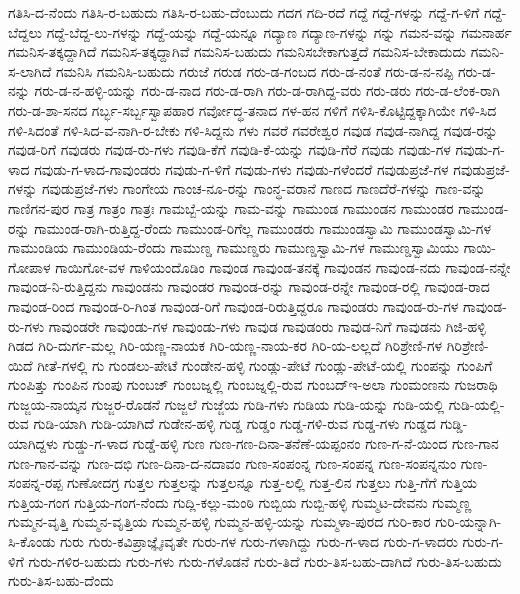 {ಗತಿಸಿ-ದ-ನೆಂದು
ಗತಿಸಿ-ರ-ಬಹುದು
ಗತಿಸಿ-ರ-ಬಹು-ದೆಂಬುದು
ಗದಗ
ಗದಿ-ರದೆ
ಗದ್ದೆ
ಗದ್ದೆ-ಗಳನ್ನು
ಗದ್ದೆ-ಗ-ಳಿಗೆ
ಗದ್ದೆ-ಬೆದ್ದಲು
ಗದ್ದೆ-ಬೆದ್ದ-ಲು-ಗಳನ್ನು
ಗದ್ದೆ-ಯನ್ನು
ಗದ್ದೆ-ಯನ್ನೂ
ಗದ್ಯಾಣ
ಗದ್ಯಾಣ-ಗಳನ್ನು
ಗನ್ನು
ಗಮನ-ವನ್ನು
ಗಮನಾರ್ಹ
ಗಮನಿಸ-ತಕ್ಕದ್ದಾಗಿದೆ
ಗಮನಿಸ-ತಕ್ಕದ್ದಾಗಿವೆ
ಗಮನಿಸ-ಬಹುದು
ಗಮನಿಸಬೇಕಾಗುತ್ತದೆ
ಗಮನಿಸ-ಬೇಕಾದುದು
ಗಮನಿ-ಸ-ಲಾಗಿದೆ
ಗಮನಿಸಿ
ಗಮನಿಸಿ-ಬಹುದು
ಗರುಜೆ
ಗರುಡ
ಗರು-ಡ-ಗಂಬದ
ಗರು-ಡ-ನಂತೆ
ಗರು-ಡ-ನ-ನಪ್ಪಿ
ಗರು-ಡ-ನನ್ನು
ಗರು-ಡ-ನ-ಹಳ್ಳಿ-ಯನ್ನು
ಗರು-ಡ-ನಾದ
ಗರು-ಡ-ರಾಗಿ
ಗರು-ಡ-ರಾಗಿದ್ದ-ವರು
ಗರು-ಡರು
ಗರು-ಡ-ಲೆಂಕ-ರಾಗಿ
ಗರು-ಡ-ಶಾ-ಸನದ
ಗರ್ಬ್ಭ-ಸರ್ಬ್ಬಸ್ವಾಪಹಾರ
ಗರ್ವೋದ್ಧ-ತನಾದ
ಗಳ-ಹನ
ಗಳಿಗೆ
ಗಳಿಸಿ-ಕೊಟ್ಟಿದ್ದಕ್ಕಾಗಿಯೇ
ಗಳಿ-ಸಿದ
ಗಳಿ-ಸಿದಂತೆ
ಗಳಿ-ಸಿದ-ವ-ನಾಗಿ-ರ-ಬೇಕು
ಗಳಿ-ಸಿದ್ದನು
ಗಳು
ಗವರೆ
ಗವರೇಶ್ವರ
ಗವುಡ
ಗವುಡ-ನಾಗಿದ್ದ
ಗವುಡ-ರನ್ನು
ಗವುಡ-ರಿಗೆ
ಗವುಡರು
ಗವುಡ-ರು-ಗಳು
ಗವುಡಿ-ಕೆಗೆ
ಗವುಡಿ-ಕೆ-ಯನ್ನು
ಗವುಡಿ-ಗೆರೆ
ಗವುಡು
ಗವುಡು-ಗಳ
ಗವುಡು-ಗ-ಳಾದ
ಗವುಡು-ಗ-ಳಾದ-ಗಾವುಂಡರು
ಗವುಡು-ಗ-ಳಿಗೆ
ಗವುಡು-ಗಳು
ಗವುಡು-ಗಳೆಂದರೆ
ಗವುಡುಪ್ರಜೆ-ಗಳ
ಗವುಡುಪ್ರಜೆ-ಗಳನ್ನು
ಗವುಡುಪ್ರಜೆ-ಗಳು
ಗಾಂಗೇಯ
ಗಾಂಚ-ನೂ-ರನ್ನು
ಗಾಂನ್ಧ-ವರಾನೆ
ಗಾಣದ
ಗಾಣದೆರೆ-ಗಳನ್ನು
ಗಾಣ-ವನ್ನು
ಗಾಣಿಗನ-ಪುರ
ಗಾತ್ರ
ಗಾತ್ರಂ
ಗಾತ್ರಃ
ಗಾಮಬ್ಬೆ-ಯನ್ನು
ಗಾಮ-ವನ್ನು
ಗಾಮುಂಡ
ಗಾಮುಂಡನ
ಗಾಮುಂಡರ
ಗಾಮುಂಡ-ರನ್ನು
ಗಾಮುಂಡ-ರಾಗಿ-ರುತ್ತಿದ್ದ-ರೆಂದು
ಗಾಮುಂಡ-ರಿಗೆಲ್ಲ
ಗಾಮುಂಡರು
ಗಾಮುಂಡಸ್ವಾಮಿ
ಗಾಮುಂಡಸ್ವಾಮಿ-ಗಳ
ಗಾಮುಂಡಿಯ
ಗಾಮುಂಡಿಯ-ರೆಂದು
ಗಾಮುಣ್ಡ
ಗಾಮುಣ್ಡರು
ಗಾಮುಣ್ಡಸ್ವಾಮಿ-ಗಳ
ಗಾಮುಣ್ಡಸ್ವಾಮಿಯು
ಗಾಯಿ-ಗೋಪಾಳ
ಗಾಯಿಗೋ-ವಳ
ಗಾಳಿಯಂದೊಡಿಂ
ಗಾವುಂಡ
ಗಾವುಂಡ-ತನಕ್ಕೆ
ಗಾವುಂಡನ
ಗಾವುಂಡ-ನದು
ಗಾವುಂಡ-ನನ್ನೇ
ಗಾವುಂಡ-ನಿ-ರುತ್ತಿದ್ದನು
ಗಾವುಂಡನು
ಗಾವುಂಡರ
ಗಾವುಂಡ-ರನ್ನು
ಗಾವುಂಡ-ರನ್ನೇ
ಗಾವುಂಡ-ರಲ್ಲಿ
ಗಾವುಂಡ-ರಾದ
ಗಾವುಂಡ-ರಿಂದ
ಗಾವುಂಡ-ರಿ-ಗಿಂತ
ಗಾವುಂಡ-ರಿಗೆ
ಗಾವುಂಡ-ರಿರುತ್ತಿದ್ದರೂ
ಗಾವುಂಡರು
ಗಾವುಂಡ-ರು-ಗಳ
ಗಾವುಂಡ-ರು-ಗಳು
ಗಾವುಂಡರೇ
ಗಾವುಂಡು-ಗಳ
ಗಾವುಂಡು-ಗಳು
ಗಾವುಡ
ಗಾವುಡಂರು
ಗಾವುಡ-ನಿಗೆ
ಗಾವುಡನು
ಗಿಜಿ-ಹಳ್ಳಿ
ಗಿಡದ
ಗಿರಿ-ದುರ್ಗ-ಮಲ್ಲ
ಗಿರಿ-ಯಣ್ಣ-ನಾಯಕ
ಗಿರಿ-ಯಣ್ಣ-ನಾಯ-ಕರ
ಗಿರಿ-ಯ-ಲಲ್ಲದೆ
ಗಿರಿಶ್ರೇಣಿ-ಗಳ
ಗಿರಿಶ್ರೇಣಿ-ಯಿದೆ
ಗೀತೆ-ಗಳಲ್ಲಿ
ಗು
ಗುಂಡಲು-ಪೇಟೆ
ಗುಂಡೇನ-ಹಳ್ಳಿ
ಗುಂಡ್ಲು-ಪೇಟೆ
ಗುಂಡ್ಲು-ಪೇಟೆ-ಯಲ್ಲಿ
ಗುಂಪನ್ನು
ಗುಂಪಿಗೆ
ಗುಂಪಿತ್ತು
ಗುಂಪಿನ
ಗುಂಪು
ಗುಂಬಜ್
ಗುಂಬಜ್ನಲ್ಲಿ
ಗುಂಬಜ್ನಲ್ಲಿ-ರುವ
ಗುಂಬದ್ಇ-ಅಲಾ
ಗುಂಮಂಣನು
ಗುಜರಾಥಿ
ಗುಜ್ಜಯ-ನಾಯ್ಕನ
ಗುಜ್ಜರ-ರೊಡನೆ
ಗುಜ್ಜಲೆ
ಗುಜ್ಜೆಯ
ಗುಡಿ-ಗಳು
ಗುಡಿಯ
ಗುಡಿ-ಯನ್ನು
ಗುಡಿ-ಯಲ್ಲಿ
ಗುಡಿ-ಯಲ್ಲಿ-ರುವ
ಗುಡಿ-ಯಾಗಿ
ಗುಡಿ-ಯಾಗಿದೆ
ಗುಡೇನ-ಹಳ್ಳಿ
ಗುಡ್ಡ
ಗುಡ್ಡಂ
ಗುಡ್ಡ-ಗಳಿ-ರುವ
ಗುಡ್ಡ-ಗಳು
ಗುಡ್ಡದ
ಗುಡ್ಡಿ-ಯಾಗಿದ್ದಳು
ಗುಡ್ಡು-ಗ-ಳಾದ
ಗುಡ್ಡೆ-ಹಳ್ಳಿ
ಗುಣ
ಗುಣ-ಗಣ-ದಿನಾ-ತನೆಣೆ-ಯಪ್ಪಂನಂ
ಗುಣ-ಗ-ನೆ-ಯಿಂದ
ಗುಣ-ಗಾನ
ಗುಣ-ಗಾನ-ವನ್ನು
ಗುಣ-ದಭಿ
ಗುಣ-ದಿನಾ-ದ-ನದಾವಂ
ಗುಣ-ಸಂಪಂನ್ನ
ಗುಣ-ಸಂಪನ್ನ
ಗುಣ-ಸಂಪನ್ನನುಂ
ಗುಣ-ಸಂಪನ್ನ-ರಪ್ಪ
ಗುಣೋದಗ್ರ
ಗುತ್ತಲ
ಗುತ್ತಲನ್ನು
ಗುತ್ತಲನ್ನೂ
ಗುತ್ತ-ಲಲ್ಲಿ
ಗುತ್ತ-ಲಿನ
ಗುತ್ತಲು
ಗುತ್ತಿ-ಗೆಗೆ
ಗುತ್ತಿಯ
ಗುತ್ತಿಯ-ಗಂಗ
ಗುತ್ತಿಯ-ಗಂಗ-ನೆಂದು
ಗುದ್ಲಿ-ಕಲ್ಲು-ಮಂಠಿ
ಗುಬ್ಬಿಯ
ಗುಬ್ಬಿ-ಹಳ್ಳಿ
ಗುಮ್ಮಟ-ದೇವನು
ಗುಮ್ಮಣ್ಣ
ಗುಮ್ಮನ-ವೃತ್ತಿ
ಗುಮ್ಮನ-ವೃತ್ತಿಯ
ಗುಮ್ಮನ-ಹಳ್ಳಿ
ಗುಮ್ಮನ-ಹಳ್ಳಿ-ಯನ್ನು
ಗುಮ್ಮಳಾ-ಪುರದ
ಗುರಿ-ಕಾರ
ಗುರಿ-ಯನ್ನಾಗಿ-ಸಿ-ಕೊಂಡು
ಗುರು
ಗುರು-ಕವಿಪ್ರಾಜ್ಞೈಃವೃತೇ
ಗುರು-ಗಳ
ಗುರು-ಗಳಾಗಿದ್ದು
ಗುರು-ಗ-ಳಾದ
ಗುರು-ಗ-ಳಾದರು
ಗುರು-ಗ-ಳಿಗೆ
ಗುರು-ಗಳಿರ-ಬಹುದು
ಗುರು-ಗಳು
ಗುರು-ಗಳೊಡನೆ
ಗುರು-ತಿದೆ
ಗುರು-ತಿಸ-ಬಹು-ದಾಗಿದೆ
ಗುರು-ತಿಸ-ಬಹುದು
ಗುರು-ತಿಸ-ಬಹು-ದೆಂದು
}
